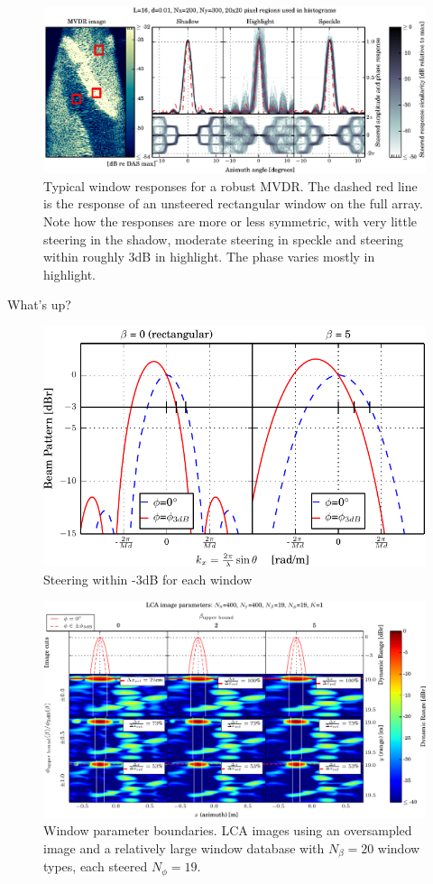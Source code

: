 \documentclass[10pt,journal,draftclsnofoot,onecolumn]{IEEEtran}
\let\MYoriglatexcaption\caption               %
\renewcommand{\caption}[2][\relax]{\MYoriglatexcaption[#2]{#2}}
\newcommand\1{\vec 1}
\begin{document}
\begin{figure}\centering%
\includegraphics[width=\linewidth]{gfx/mvdr_selected_windows.eps}%
\caption{Typical window responses for a robust MVDR. The dashed red line is the response of an unsteered rectangular window on the full array. Note how the responses are more or less symmetric, with very little steering in the shadow, moderate steering in speckle and steering within roughly 3dB in highlight. The phase varies mostly in highlight. }\label{mvdr_selected_windows}
\end{figure}

What's up?

\begin{figure}%
\includegraphics[width=.5\linewidth]{gfx/calc_kaiser_3dB.pdf}%
\caption{Steering within -3dB for each window}\label{windows_steering}
\end{figure}

\newpage
\begin{figure}%
\includegraphics[width=\textwidth]{gfx/oversampling_mosaic_bounds.pdf}%
\caption{Window parameter boundaries. LCA images using an oversampled image and a relatively large window database with $N_\beta=20$ window types, each steered $N_\phi=19$. }\label{oversampling_mosaic_bounds}
\end{figure}
\end{document}
